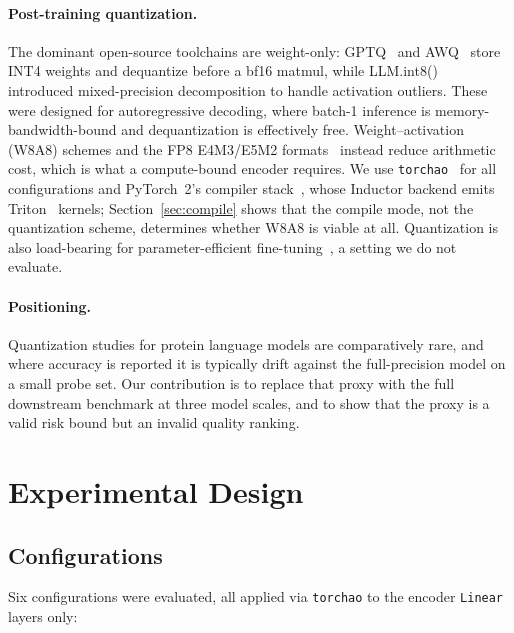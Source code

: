 \documentclass[11pt]{article}
\begin{document}
\paragraph{Post-training quantization.} The dominant open-source toolchains are
weight-only: GPTQ~\cite{frantar2023gptq} and AWQ~\cite{lin2024awq} store INT4
weights and dequantize before a bf16 matmul, while
LLM.int8()~\cite{dettmers2022llmint8} introduced mixed-precision decomposition to
handle activation outliers. These were designed for autoregressive decoding,
where batch-1 inference is memory-bandwidth-bound and dequantization is
effectively free. Weight--activation (W8A8) schemes and the FP8 E4M3/E5M2
formats~\cite{micikevicius2022fp8} instead reduce arithmetic cost, which is what
a compute-bound encoder requires. We use \texttt{torchao}~\cite{torchao} for all
configurations and PyTorch~2's compiler stack~\cite{ansel2024pytorch2}, whose
Inductor backend emits Triton~\cite{tillet2019triton} kernels;
Section~\ref{sec:compile} shows
that the compile mode, not the quantization scheme, determines whether W8A8 is
viable at all. Quantization is also load-bearing for parameter-efficient
fine-tuning~\cite{dettmers2023qlora}, a setting we do not evaluate.

\paragraph{Positioning.} Quantization studies for protein language models are
comparatively rare, and where accuracy is reported it is typically drift against
the full-precision model on a small probe set. Our contribution is to replace
that proxy with the full downstream benchmark at three model scales, and to
show that the proxy is a valid risk bound but an invalid quality ranking.

\section{Experimental Design}

\subsection{Configurations}

Six configurations were evaluated, all applied via \texttt{torchao} to the
encoder \texttt{Linear} layers only:
\end{document}
